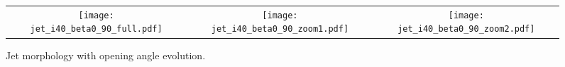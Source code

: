 \documentclass[iop]{emulateapj}
\begin{document}
\begin{figure*}
\begin{center}
  \begin{tabular}{ccc}
    \texttt{[image: jet\_i40\_beta0\_90\_full.pdf]} &
    \texttt{[image: jet\_i40\_beta0\_90\_zoom1.pdf]} &
    \texttt{[image: jet\_i40\_beta0\_90\_zoom2.pdf]}
  \end{tabular}
\end{center}
\caption{Jet morphology with opening angle evolution.}
\label{fig:jet_psi}
\end{figure*}


\end{document}
